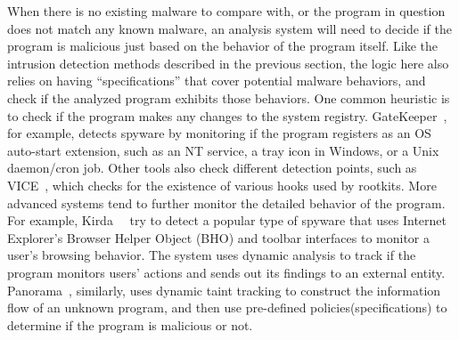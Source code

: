 When there is no existing malware to compare with, or the program in question 
does not match any known malware, an analysis system will need to decide if
the program is malicious just based on the behavior of the program itself. Like
the intrusion detection methods described in the previous section, the logic
here also relies on having ``specifications'' that cover potential malware 
behaviors, and check if the analyzed program exhibits those behaviors. One 
common heuristic is to check if the program makes any changes to the system
registry. GateKeeper~\cite{wang2004gatekeeper}, for example, detects spyware
by monitoring if the program registers as an OS auto-start extension, such as 
an NT service, a tray icon in Windows, or a Unix daemon/cron job. Other tools
also check different detection points, such as VICE~\cite{bulter2004vice}, which
checks for the existence of various hooks used by rootkits. More advanced 
systems tend to further monitor the detailed behavior of the program. For example, 
Kirda~\etal~\cite{kirda2006behavior} try to detect a popular type of
spyware that uses Internet Explorer’s Browser Helper Object (BHO) and 
toolbar interfaces to monitor a user’s browsing behavior. The system uses 
dynamic analysis to track if the program monitors users' actions and sends
out its findings to an external entity. Panorama~\cite{yin2007panorama}, 
similarly, uses dynamic taint tracking to construct the information flow of
an unknown program, and then use pre-defined policies(specifications) to 
determine if the program is malicious or not.